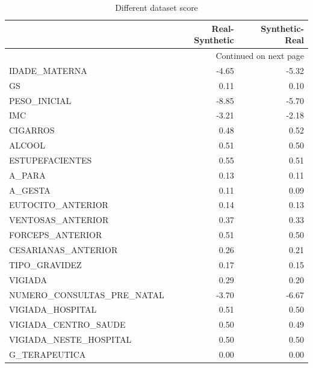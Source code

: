 \documentclass{article}
\begin{document}
\begin{longtable}{lrr}
\caption{Different dataset score}\label{tab:difdatascore}\\
\toprule
{} &  Real-Synthetic &  Synthetic-Real \\
\midrule
\endhead
\midrule
\multicolumn{3}{r}{{Continued on next page}} \\
\midrule
\endfoot

\bottomrule
\endlastfoot
IDADE\_MATERNA                 &           -4.65 &           -5.32 \\
GS                            &            0.11 &            0.10 \\
PESO\_INICIAL                  &           -8.85 &           -5.70 \\
IMC                           &           -3.21 &           -2.18 \\
CIGARROS                      &            0.48 &            0.52 \\
ALCOOL                        &            0.51 &            0.50 \\
ESTUPEFACIENTES               &            0.55 &            0.51 \\
A\_PARA                        &            0.13 &            0.11 \\
A\_GESTA                       &            0.11 &            0.09 \\
EUTOCITO\_ANTERIOR             &            0.14 &            0.13 \\
VENTOSAS\_ANTERIOR             &            0.37 &            0.33 \\
FORCEPS\_ANTERIOR              &            0.51 &            0.50 \\
CESARIANAS\_ANTERIOR           &            0.26 &            0.21 \\
TIPO\_GRAVIDEZ                 &            0.17 &            0.15 \\
VIGIADA                       &            0.29 &            0.20 \\
NUMERO\_CONSULTAS\_PRE\_NATAL    &           -3.70 &           -6.67 \\
VIGIADA\_HOSPITAL              &            0.51 &            0.50 \\
VIGIADA\_CENTRO\_SAUDE          &            0.50 &            0.49 \\
VIGIADA\_NESTE\_HOSPITAL        &            0.50 &            0.50 \\
G\_TERAPEUTICA                 &            0.00 &            0.00 \\

\end{longtable}
\end{document}
